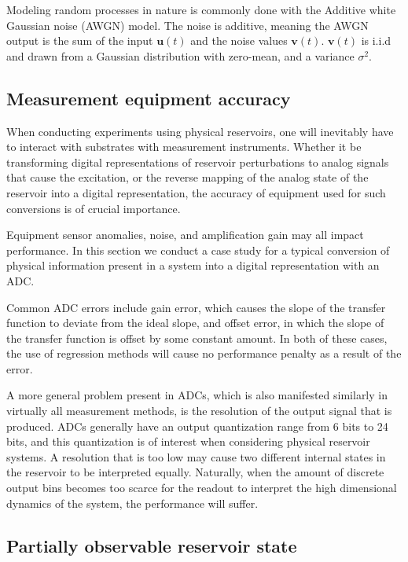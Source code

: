 Modeling random processes in nature is commonly done with the Additive white
Gaussian noise (AWGN) model. The noise is additive, meaning the AWGN output is
the sum of the input $\mathbf{u}(t)$ and the noise values
$\mathbf{v}(t)$. $\mathbf{v}(t)$ is i.i.d and drawn from a Gaussian distribution
with zero-mean, and a variance $\sigma^{2}$.

\subsection{Measurement equipment accuracy}

When conducting experiments using physical reservoirs, one will inevitably have
to interact with substrates with measurement instruments. Whether it be
transforming digital representations of reservoir perturbations to analog
signals that cause the excitation, or the reverse mapping of the analog state of
the reservoir into a digital representation, the accuracy of equipment used for
such conversions is of crucial importance.

Equipment sensor anomalies, noise, and amplification gain may all impact
performance. In this section we conduct a case study for a typical conversion of
physical information present in a system into a digital representation with an
ADC.

Common ADC errors include gain error, which causes the slope of the transfer
function to deviate from the ideal slope, and offset error, in which the slope
of the transfer function is offset by some constant amount. In both of these
cases, the use of regression methods will cause no performance penalty as a
result of the error.

A more general problem present in ADCs, which is also manifested similarly in
virtually all measurement methods, is the resolution of the output signal that
is produced. ADCs generally have an output quantization range from 6 bits to 24
bits, and this quantization is of interest when considering physical reservoir
systems. A resolution that is too low may cause two different internal states in
the reservoir to be interpreted equally. Naturally, when the amount of discrete
output bins becomes too scarce for the readout to interpret the high dimensional
dynamics of the system, the performance will suffer.

\subsection{Partially observable reservoir state}

